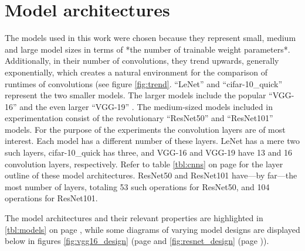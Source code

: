 \section{Model architectures}
The models used in this work were chosen because they represent small, medium and large model sizes in terms of *the number of trainable weight parameters*. Additionally, in their number of convolutions, they trend upwards, generally exponentially, which creates a natural environment for the comparison of runtimes of convolutions (see figure \ref{fig:trend}. ``LeNet'' \cite{mnist} and ``cifar-10\_quick'' \cite{cifar} represent the two smaller models. The larger models include the popular ``VGG-16'' and the even larger ``VGG-19'' \cite{return}. The medium-sized models included in experimentation consist of the revolutionary ``ResNet50'' and ``ResNet101'' \cite{resnets2} models. For the purpose of the experiments the convolution layers are of most interest. Each model has a different number of these layers. LeNet has a mere two such layers, cifar-10\_quick has three, and VGG-16 and VGG-19 have 13 and 16 convolution layers, respectively. Refer to table \ref{tbl:cnns} on page \pageref{tbl:cnns} for the layer outline of these model architectures. ResNet50 and ResNet101 have---by far---the most number of layers, totaling 53 such operations for ResNet50, and 104 operations for ResNet101.


The model architectures and their relevant properties are highlighted in \ref{tbl:models} on page \pageref{tbl:models}, while some diagrams of varying model designs are displayed below in figures \ref{fig:vgg16_design} (page \pageref {fig:vgg16_design} and \ref{fig:resnet_design} (page \pageref{fig:resnet_design})).



